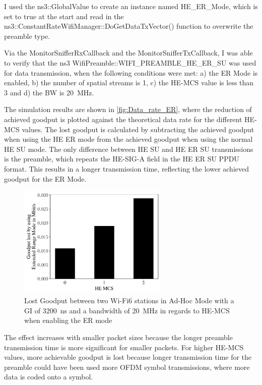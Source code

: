 I used the ns3::GlobalValue to create an instance named HE\_ER\_Mode, which is set to true at the start and read in the ns3::ConstantRateWifiManager::Do\-Get\-Data\-Tx\-Vector() function
to overwrite the preamble type.

Via the MonitorSnifferRxCallback and the MonitorSnifferTxCallback, I was able to verify that the ns3 WifiPreamble::WIFI\_PREAMBLE\_HE\_ER\_SU was used
for data transmission, when the following conditions were met: a) the \ac{ER} Mode is enabled, b) the number of spatial streams is \num{1}, c) the \ac{HE}-\ac{MCS} value is less than \num{3} and
d) the \ac{BW} is \SI{20}{\mega\hertz}.

The simulation results are shown in \autoref{fig:Data_rate_ER}, where the reduction of achieved goodput is plotted against the theoretical data rate for the different \ac{HE}-\ac{MCS} values.
The lost goodput is calculated by subtracting the achieved goodput when using the \ac{HE} \ac{ER} mode from the achieved goodput when using the normal \ac{HE} SU mode.
The only difference between \ac{HE} SU and \ac{HE} \ac{ER} SU transmissions is the preamble, which repeats the \ac{HE}-SIG-A field in the \ac{HE} \ac{ER} SU \ac{PPDU} format.
This results in a longer transmission time, reflecting the lower achieved goodput for the \ac{ER} Mode.
\begin{figure}[H]%
   \centering
   \includegraphics[width=0.64\textwidth]{figures/ER_dataRate_simulation.pdf}
   \caption{Lost Goodput between two Wi-Fi6 stations in Ad-Hoc Mode with a
   \acf{GI} of \SI{3200}{\nano\second} and a bandwidth of \SI{20}{\mega\hertz} in regards to \acf{HE}-\acf{MCS} when enabling the \ac{ER} mode}%
   \label{fig:Data_rate_ER}%
\end{figure}
The effect increases with smaller packet sizes because the longer preamble transmission time is more significant for smaller packets.
For higher \ac{HE}-\ac{MCS} values, more achievable goodput is lost because longer transmission time for the preamble could have
been used more \ac{OFDM} symbol transmissions, where more data is coded onto a symbol.

